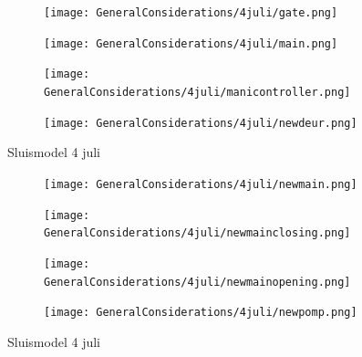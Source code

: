 \documentclass{article}
\begin{document}
	
	
	
	
	
	
	
	
	\begin{figure}
		\centering
		\begin{subfigure}{0.45\linewidth}
			\texttt{[image: GeneralConsiderations/4juli/gate.png]}
			\caption{}
			\label{fig:1a}
		\end{subfigure}\hfill
		\begin{subfigure}{0.45\linewidth}
			\texttt{[image: GeneralConsiderations/4juli/main.png]}
			\caption{}
			\label{fig:1a}
		\end{subfigure}
		
		\begin{subfigure}{0.45\linewidth}
			\texttt{[image: GeneralConsiderations/4juli/manicontroller.png]}
			\caption{}
			\label{fig:1a}
		\end{subfigure}\hfill
		\begin{subfigure}{0.45\linewidth}
			\texttt{[image: GeneralConsiderations/4juli/newdeur.png]}
			\caption{}
			\label{fig:1a}
		\end{subfigure}
		\caption{Sluismodel 4 juli}
		\label{fig:1}
	\end{figure}
	
	
	
	
	
	\begin{figure}
		\centering
		\begin{subfigure}{0.45\linewidth}
			\texttt{[image: GeneralConsiderations/4juli/newmain.png]}
			\caption{}
			\label{fig:1a}
		\end{subfigure}\hfill
		\begin{subfigure}{0.45\linewidth}
			\texttt{[image: GeneralConsiderations/4juli/newmainclosing.png]}
			\caption{}
			\label{fig:1a}
		\end{subfigure}
		
		\begin{subfigure}{0.45\linewidth}
			\texttt{[image: GeneralConsiderations/4juli/newmainopening.png]}
			\caption{}
			\label{fig:1a}
		\end{subfigure}\hfill
		\begin{subfigure}{0.45\linewidth}
			\texttt{[image: GeneralConsiderations/4juli/newpomp.png]}
			\caption{}
			\label{fig:1a}
		\end{subfigure}
		\caption{Sluismodel 4 juli}
		\label{fig:1}
	\end{figure}
	
\end{document}
